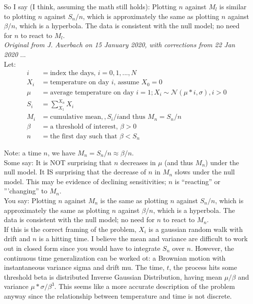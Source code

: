 \documentclass[11pt,letter]{article}
\begin{document}
So I say (I think, assuming the math still holds): Plotting $n$ against $M_l$ is similar to plotting $n$ against $S_n / n$, which is approximately the same as plotting $n$ against $\beta/n$, which is a hyperbola. The data is consistent with the null model; no need for $n$ to react to $M_l$.\\

\newpage
\emph{Original from J. Auerbach on 15 January 2020, with corrections from 22 Jan 2020} ...\\
Let:
\begin{align*}
i & = \text{index the days, }  i = 0, 1, ..., N\\
X_i & = \text{temperature on day $i$, assume } X_0 = 0\\
\mu & = \text{average temperature on day } i = 1; X_i \sim \mathcal{N}(\mu * i, \sigma), i > 0\\
S_i & = \sum_{X_1}^{X_n} X_i \\
M_i & = \text{cumulative mean}, , S_i / i \text{and thus } M_n=S_n/n  \\
\beta & = \text{a threshold of interest, } \beta > 0\\
n &  = \text{the first day such that }  \beta < S_n
\end{align*}

Note: a time $n$, we have $M_n = S_n / n \approx \beta / n$.\\

Some say: It is NOT surprising that $n$ decreases in $\mu$ (and thus $M_n$) under the null model. It IS surprising that the decrease of $n$ in $M_n$ slows under the null model. This may be evidence of declining sensitivities; $n$ is ``reacting'' or '''changing'' to $M_n$.\\

You say: Plotting $n$ against $M_n$ is the same as plotting $n$ against $S_n / n$, which is approximately the same as plotting $n$ against $\beta/n$, which is a hyperbola. The data is consistent with the null model; no need for $n$ to react to $M_n$.\\

If this is the correct framing of the problem, $X_i$ is a gaussian random walk with drift and $n$ is a hitting time. I believe the mean and variance are difficult to work out in closed form since you would have to integrate $S_n$ over $n$. However, the continuous time generalization can be worked ot: a Brownian motion with instantaneous variance sigma and drift mu. The time, $t$, the process hits some threshold beta is distributed Inverse Gaussian Distribution, having mean $\mu/\beta$ and variance $\mu * \sigma / \beta^3$. This seems like a more accurate description of the problem anyway since the relationship between temperature and time is not discrete. \\
\end{document}

